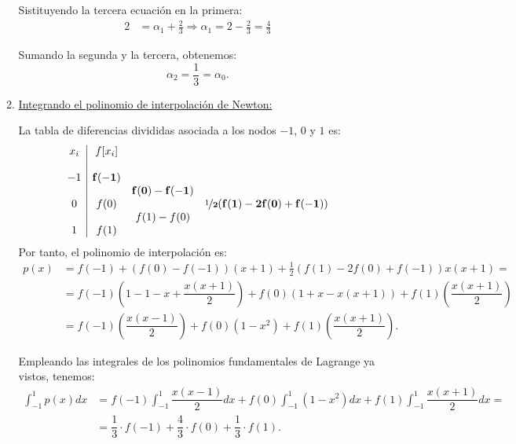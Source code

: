 \begin{ejercicio}
\begin{enumerate}
\begin{enumerate}
            Sistituyendo la tercera ecuación en la primera:
            \begin{align*}
                2 &= \alpha_1 + \frac{2}{3}\Longrightarrow \alpha_1 = 2 - \frac{2}{3} = \frac{4}{3}
            \end{align*}

            Sumando la segunda y la tercera, obtenemos:
            \begin{equation*}
                \alpha_2 = \frac{1}{3} = \alpha_0.
            \end{equation*}


            \item \ul{Integrando el polinomio de interpolación de Newton:}
            
            La tabla de diferencias divididas asociada a los nodos $-1$, $0$ y $1$ es:
            \begin{equation*}
                \begin{array}{c|cccc}
                    x_i & f[x_i] \\
                    \\
                    -1 & \mathbf{f(-1)} \\
                    && \mathbf{f(0)-f(-1)} \\
                    0 & f(0) & & \mathbf{\nicefrac{1}{2}(f(1)-2f(0)+f(-1))}\\
                    && f(1)-f(0)\\
                    1 & f(1)
                \end{array}
            \end{equation*}
            Por tanto, el polinomio de interpolación es:
            \begin{align*}
                p(x) &= f(-1) + \left(f(0)-f(-1)\right)(x+1) + \frac{1}{2}\left(f(1)-2f(0)+f(-1)\right)x(x+1)
                =\\&= f(-1)\left(1-1-x+\dfrac{x(x+1)}{2}\right) + f(0)\left(1+x-x(x+1)\right) + f(1)\left(\dfrac{x(x+1)}{2}\right)\\
                &= f(-1)\left(\dfrac{x(x-1)}{2}\right) + f(0)\left(1-x^2\right) + f(1)\left(\dfrac{x(x+1)}{2}\right).
            \end{align*}

            Empleando las integrales de los polinomios fundamentales de Lagrange ya vistos, tenemos:
            \begin{align*}
                \int_{-1}^{1} p(x) dx &= f(-1)\int_{-1}^{1} \dfrac{x(x-1)}{2} dx + f(0)\int_{-1}^{1} (1-x^2) dx + f(1)\int_{-1}^{1} \dfrac{x(x+1)}{2} dx =\\
                &= \dfrac{1}{3}\cdot f(-1) + \dfrac{4}{3}\cdot f(0) + \dfrac{1}{3}\cdot f(1).
            \end{align*}
        \end{enumerate}


\end{enumerate}
\end{ejercicio}
